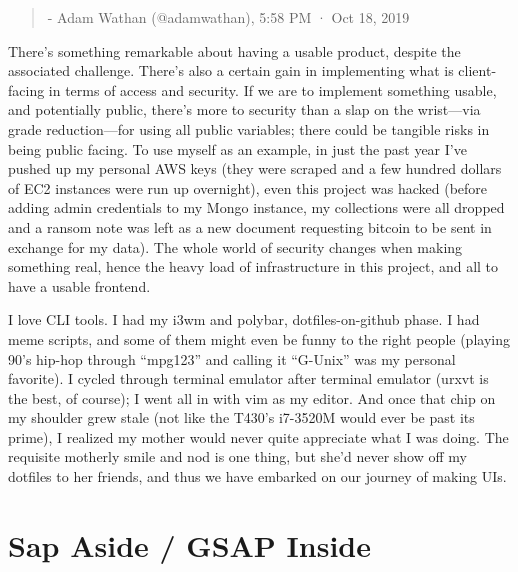 \documentclass[11pt, twoside, reqno]{book}
\begin{document}
\begin{quote}
- Adam Wathan (@adamwathan), 5:58 PM · Oct 18, 2019
\end{quote}


There's something remarkable about having a usable product, despite the associated challenge. There's also a certain gain in implementing what is client-facing in terms of access and security. If we are to implement something usable, and potentially public, there's more to security than a slap on the wrist—via grade reduction—for using all public variables; there could be tangible risks in being public facing. To use myself as an example, in just the past year I've pushed up my personal AWS keys (they were scraped and a few hundred dollars of EC2 instances were run up overnight), even this project was hacked (before adding admin credentials to my Mongo instance, my collections were all dropped and a ransom note was left as a new document requesting bitcoin to be sent in exchange for my data). The whole world of security changes when making something real, hence the heavy load of infrastructure in this project, and all to have a usable frontend.

I love CLI tools. I had my i3wm and polybar, dotfiles-on-github phase. I had meme scripts, and some of them might even be funny to the right people (playing 90's hip-hop through ``mpg123'' and calling it ``G-Unix'' was my personal favorite). I cycled through terminal emulator after terminal emulator (urxvt is the best, of course); I went all in with vim as my editor. And once that chip on my shoulder grew stale (not like the T430's i7-3520M would ever be past its prime), I realized my mother would never quite appreciate what I was doing. The requisite motherly smile and nod is one thing, but she'd never show off my dotfiles to her friends, and thus we have embarked on our journey of making UIs.


\section{Sap Aside / GSAP Inside}
\end{document}
